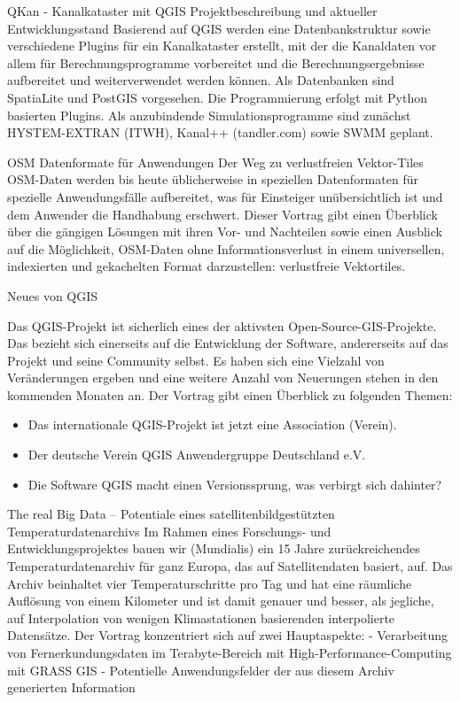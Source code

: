 %
{QKan - Kanalkataster mit QGIS}%
{Projektbeschreibung und aktueller Entwicklungsstand}%
{Basierend auf QGIS werden eine Datenbankstruktur sowie verschiedene Plugins für ein Kanalkataster
erstellt, mit der die Kanaldaten vor allem für Berechnungsprogramme vorbereitet und die
Berechnungsergebnisse aufbereitet und weiterverwendet werden können. Als Datenbanken sind SpatiaLite
und PostGIS vorgesehen. Die Programmierung erfolgt mit Python basierten Plugins. Als anzubindende
Simulationsprogramme sind zunächst HYSTEM-EXTRAN (ITWH), Kanal++ (tandler.com) sowie SWMM geplant. }

%
{OSM Datenformate für Anwendungen}%
{Der Weg zu verlustfreien Vektor-Tiles}%
{OSM-Daten werden bis heute üblicherweise in speziellen Datenformaten für spezielle Anwendungsfälle
aufbereitet, was für Einsteiger unübersichtlich ist und dem Anwender die Handhabung erschwert.
Dieser Vortrag gibt einen Überblick über die gängigen Lösungen mit ihren Vor- und Nachteilen sowie
einen Ausblick auf die Möglichkeit, OSM-Daten ohne Informationsverlust in einem universellen,
indexierten und gekachelten Format darzustellen: verlustfreie Vektortiles.  }

%
{Neues von QGIS}%
{}%
{Das QGIS-Projekt ist sicherlich eines der aktivsten Open-Source-GIS-Projekte.
Das bezieht sich einerseits auf die Entwicklung der Software,
andererseits auf das Projekt und seine Community selbst. Es haben sich eine
Vielzahl von Veränderungen ergeben und eine weitere Anzahl von Neuerungen
stehen in den kommenden Monaten an. Der Vortrag gibt einen Überblick zu folgenden Themen:
\begin{itemize}\setlength\itemsep{-1pt}
\item Das internationale QGIS-Projekt ist jetzt eine Association (Verein).
\item Der deutsche Verein QGIS Anwendergruppe Deutschland e.V.
\item Die Software QGIS macht einen Versionssprung, was verbirgt sich dahinter?
\end{itemize}%
}

%
{The real Big Data – Potentiale eines satellitenbildgestützten Temperaturdatenarchivs}%
{}%
{Im Rahmen eines Forschungs- und Entwicklungsprojektes bauen wir (Mundialis) ein 15 Jahre
  zurückreichendes Temperaturdatenarchiv für ganz Europa, das auf Satellitendaten basiert, auf.
  Das Archiv beinhaltet vier Temperaturschritte pro Tag und hat eine räumliche Auflösung von einem
  Kilometer und ist damit genauer und besser, als jegliche, auf Interpolation von wenigen
  Klimastationen basierenden interpolierte Datensätze.
  Der Vortrag konzentriert sich auf zwei Hauptaspekte:
  - Verarbeitung von Fernerkundungsdaten im Terabyte-Bereich mit High-Performance-Computing mit
  GRASS GIS
- Potentielle Anwendungsfelder der aus diesem Archiv generierten Information}

